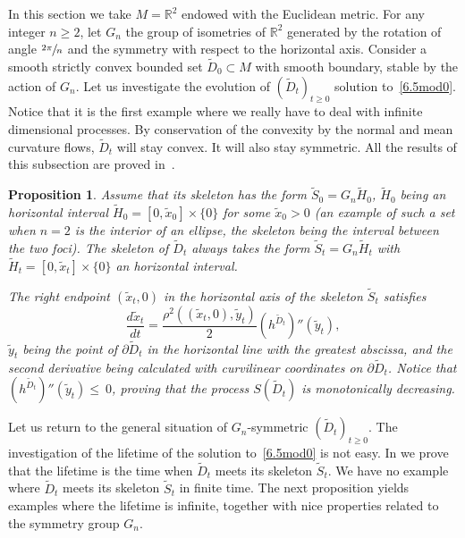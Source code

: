 \documentclass[10pt]{amsart}
\theoremstyle{plain}
\newtheorem{prop}[thm]{Proposition}
\theoremstyle{definition}
\newcommand{\RR}{{\mathbb R}}
\let\di\displaystyle
\let\f\frac
\let\wi\widetilde
\begin{document}
In this section we take $M=\RR^2$ endowed with the Euclidean metric.
For any integer $n\ge 2$, let $G_n$ the group of isometries of $\RR^2$ generated by the rotation of angle $\di \sfrac{2\pi}n$ and the symmetry with respect to the horizontal axis.
Consider a smooth strictly convex bounded set $\wi D_0\subset M$ with smooth boundary, stable by the action of $G_n$.
Let us investigate the evolution of $(\wi D_t)_{t\ge0}$ solution to~\eqref{6.5mod0}. Notice that it is the first example where we really have to deal with infinite dimensional processes.
By conservation of the convexity by the normal and mean curvature flows, $\wi D_t$ will stay convex. It will also stay symmetric. All the results of this subsection are proved in~\cite{ACM:21}.
\begin{prop}
\label{P5.4.1}
Assume that its skeleton has the form $\wi S_0=G_n\wi H_0$, $\wi H_0$ being an horizontal interval $\wi H_0=[0,\wi x_0]\times \{0\}$ for some $\wi x_0>0$ (an example of such a set when $n=2$ is the interior of an ellipse, the skeleton being the interval between the two foci).
The skeleton of $\wi D_t$ always takes the form $\wi S_t=G_n\wi H_t$ with $\wi H_t=[0,\wi x_t]\times\{0\}$ an horizontal interval.

The right endpoint $(\wi x_t,0)$ in the horizontal axis of the skeleton $\wi S_t$ satisfies\vspace*{-3pt}\enlargethispage{\baselineskip}
\begin{equation}
\f{d\wi x_t}{dt}=\f{\rho^2((\wi x_t,0),\wi y_t)}2(h^{\wi D_t})''(\wi y_t),
\end{equation}
$\wi y_t$ being the point of $ \partial \wi D_t$ in the horizontal line with the greatest abscissa, and the second derivative being calculated with curvilinear coordinates on $\partial \wi D_t$. Notice that $(h^{\wi D_t})''(\tilde y_t)\le~0$, proving that the process $S(\wi D_t)$ is monotonically decreasing.
\end{prop}
Let us return to the general situation of $G_n$-symmetric $(\wi D_t)_{t\ge0}$.
The investigation of the lifetime of the solution to~\eqref{6.5mod0} is not easy. In \cite{ACM:21} we prove that the lifetime is the time when $\wi D_t$ meets its skeleton $\wi S_t$.
We have no example where $\tilde D_t$ meets its skeleton $\tilde S_t$ in finite time. The next proposition yields examples where the lifetime is infinite, together with nice properties related to the symmetry group $G_n$.
\end{document}
